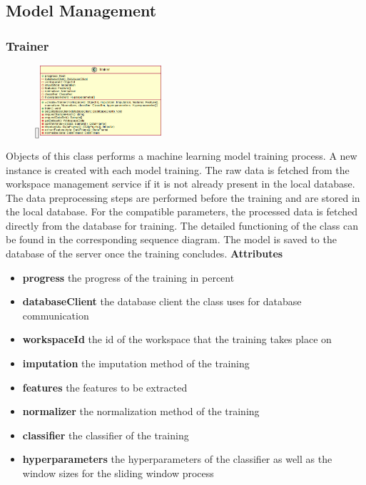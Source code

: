 \subsection{Model Management}

\subsubsection{Trainer}
\begin{figure}
    \raisebox{0pt}[\dimexpr{}\baselineskip\relax]{\includegraphics[width=4.5cm]{classes/model-management/1.png}}
\end{figure} 
\par
Objects of this class performs a machine learning model training process. A new instance is created with each model training. The raw data is fetched from the workspace management service if it is not already present in the local database. The data preprocessing steps are performed before the training and are stored in the local database. For the compatible parameters, the processed data is fetched directly from the database for training. The detailed functioning of the class can be found in the corresponding sequence diagram. The model is saved to the database of the server once the training concludes.
\newline
\newline
\textbf{Attributes}
\begin{itemize}
    \item \textbf{progress} the progress of the training in percent
    \item \textbf{databaseClient} the database client the class uses for database communication
    \item \textbf{workspaceId} the id of the workspace that the training takes place on
    \item \textbf{imputation} the imputation method of the training
    \item \textbf{features} the features to be extracted
    \item \textbf{normalizer} the normalization method of the training
    \item \textbf{classifier} the classifier of the training
    \item \textbf{hyperparameters} the hyperparameters of the classifier as well as the window sizes for the sliding window process
\end{itemize}
